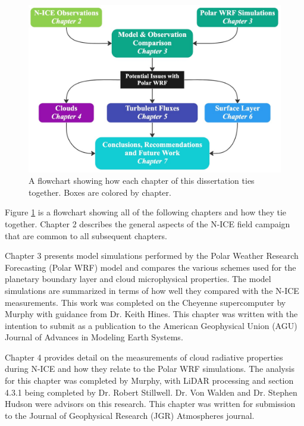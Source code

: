 \begin{figure}[b!]
    \centering 
    \includegraphics[width=1\linewidth]{figures/flowchart.jpg}
    \caption[Flowchart of dissertation chapters.]{A flowchart showing how each chapter of this dissertation ties together. Boxes are colored by chapter.}
    \label{fig:flowchart}
\end{figure}

Figure \ref{fig:flowchart} is a flowchart showing all of the following chapters and how they tie together. Chapter 2 describes the general aspects of the N-ICE field campaign that are common to all subsequent chapters. 

Chapter 3 presents model simulations performed by the Polar Weather Research Forecasting (Polar WRF) model and compares the various schemes used for the planetary boundary layer and cloud microphysical properties. The model simulations are summarized in terms of how well they compared with the N-ICE measurements. This work was completed on the Cheyenne \citep{cheyenne} supercomputer by Murphy with guidance from Dr. Keith Hines. This chapter was written with the intention to submit as a publication to the American Geophysical Union (AGU) Journal of Advances in Modeling Earth Systems.

Chapter 4 provides detail on the measurements of cloud radiative properties during N-ICE and how they relate to the Polar WRF simulations. The analysis for this chapter was completed by Murphy, with LiDAR processing and section 4.3.1 being completed by Dr. Robert Stillwell. Dr. Von Walden and Dr. Stephen Hudson were advisors on this research. This chapter was written for submission to the Journal of Geophysical Research (JGR) Atmospheres journal.

